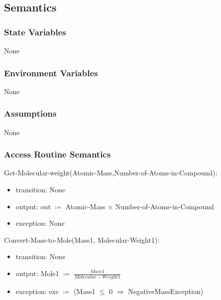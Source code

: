 \documentclass[12pt, titlepage]{article}
\begin{document}

\subsection{Semantics}

\subsubsection{State Variables}

None


\subsubsection{Environment Variables}

None

\subsubsection{Assumptions}

None

\subsubsection{Access Routine Semantics}

\noindent Get-Molecular-weight(Atomic-Mass,Number-of-Atoms-in-Compound):
\begin{itemize}
\item transition: None
\item output: out $\coloneqq$  Atomic-Mass $\times$ Number-of-Atoms-in-Compound
\item exception: None 
\end{itemize}

\noindent Convert-Mass-to-Mole(Mass1, Molecular-Weight1):
\begin{itemize}
\item transition: None
\item output: Mole1 $\coloneqq$  $\frac{Mass1}{Molecular-Weight1}$
\item exception: exc $\coloneqq$ (Mass1 $\leq$ 0 $\Rightarrow$ NegativeMassException) 
\end{itemize}
\end{document}
